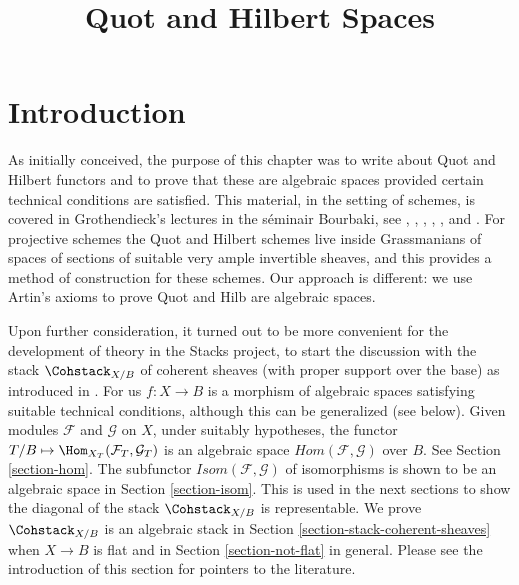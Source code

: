 

%


\title{Quot and Hilbert Spaces}

\maketitle

\label{section-phantom}

\tableofcontents




\section{Introduction}
\label{section-introduction}

\noindent
As initially conceived, the purpose of this chapter was to write about
Quot and Hilbert functors and to prove that these are algebraic spaces
provided certain technical conditions are satisfied. This material, in
the setting of schemes, is
covered in Grothendieck's lectures in the s\'eminair Bourbaki, see
\cite{Gr-I},
\cite{Gr-II},
\cite{Gr-III},
\cite{Gr-IV},
\cite{Gr-V}, and
\cite{Gr-VI}. For projective schemes the Quot and Hilbert schemes
live inside Grassmanians of spaces of sections of suitable very
ample invertible sheaves, and this provides a method of construction
for these schemes. Our approach is different: we use Artin's axioms to
prove Quot and Hilb are algebraic spaces.

\medskip\noindent
Upon further consideration, it turned out to be more convenient for
the development of theory in the Stacks project, to start the
discussion with the stack $\Cohstack_{X/B}$
of coherent sheaves (with proper support over the base)
as introduced in \cite{lieblich_remarks}. For us $f : X \to B$
is a morphism of algebraic spaces satisfying suitable
technical conditions, although this can be generalized (see below).
Given modules $\mathcal{F}$ and $\mathcal{G}$
on $X$, under suitably hypotheses, the functor
$T/B \mapsto \Hom_{X_T}(\mathcal{F}_T, \mathcal{G}_T)$
is an algebraic space $\mathit{Hom}(\mathcal{F}, \mathcal{G})$
over $B$. See Section \ref{section-hom}. The subfunctor
$\mathit{Isom}(\mathcal{F}, \mathcal{G})$ of isomorphisms is
shown to be an algebraic space in Section \ref{section-isom}.
This is used in the next sections to show the diagonal of
the stack $\Cohstack_{X/B}$ is representable. We prove
$\Cohstack_{X/B}$ is an algebraic stack in
Section \ref{section-stack-coherent-sheaves} when $X \to B$ is flat
and in Section \ref{section-not-flat} in general.
Please see the introduction of this section for pointers
to the literature.

